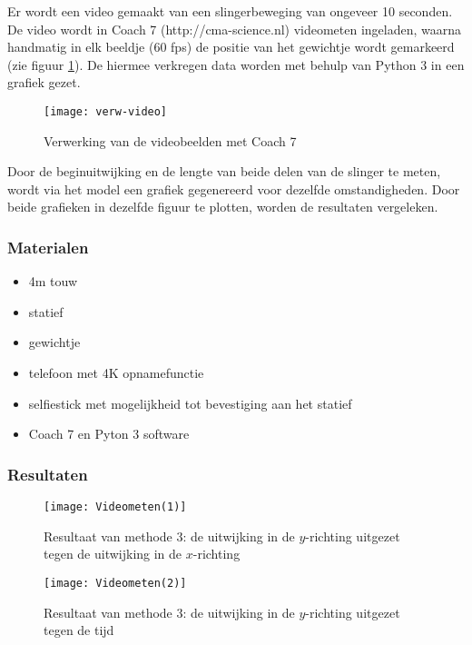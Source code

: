 \documentclass[a4paper]{article}
\begin{document}
	Er wordt een video gemaakt van een slingerbeweging van ongeveer 10 seconden. De video wordt in Coach 7 (http://cma-science.nl) videometen ingeladen, waarna handmatig in elk beeldje (60 fps) de positie van het gewichtje wordt gemarkeerd (zie figuur \ref{fig:verw-video}). De hiermee verkregen data worden met behulp van Python 3 in een grafiek gezet. 
	
	\begin{figure}[!h]
		\centering
		\texttt{[image: verw-video]}
		\caption{Verwerking van de videobeelden met Coach 7}
		\label{fig:verw-video}
	\end{figure}
	
	Door de beginuitwijking en de lengte van beide delen van de slinger te meten, wordt via het model een grafiek gegenereerd voor dezelfde omstandigheden. Door beide grafieken in dezelfde figuur te plotten, worden de resultaten vergeleken.
	
	\subsubsection*{Materialen}
	\begin{itemize}
		\setlength\itemsep{0em}
		\item 4m touw
		\item statief
		\item gewichtje
		\item telefoon met 4K opnamefunctie
		\item selfiestick met mogelijkheid tot bevestiging aan het statief
		\item Coach 7 en Pyton 3 software
	\end{itemize}
	
	\subsubsection*{Resultaten}
	\begin{figure}[!h]
		\centering
		\texttt{[image: Videometen(1)]}
		\caption{Resultaat van methode 3: de uitwijking in de $y$-richting uitgezet tegen de uitwijking in de $x$-richting}
		\label{fig:Videometen(1)}
	\end{figure}
	
	\begin{figure}[!h]
		\centering
		\texttt{[image: Videometen(2)]}
		\caption{Resultaat van methode 3: de uitwijking in de $y$-richting uitgezet tegen de tijd}
		\label{fig:Videometen(2)}
	\end{figure}
	
\end{document}
